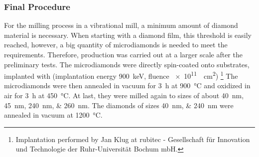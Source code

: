 	\subsubsection{Final Procedure}\label{subsubsec::final_procedure}

	For the milling process in a vibrational mill, a minimum amount of diamond material is necessary.
	When starting with a diamond film, this threshold is easily reached, however, a big quantity of microdiamonds is needed to meet the requirements.
	Therefore, production was carried out at a larger scale after the preliminary tests.
	The microdiamonds were directly spin-coated onto \ir substrates, implanted with  (implantation energy \SI{900}{keV}, fluence \SI{e11}{\per\centi\meter\squared}) \footnote{Implantation performed by Jan Klug at rubitec - Gesellschaft f\"ur Innovation und Technologie der Ruhr-Universit\"at Bochum mbH.}
	The microdiamonds were then annealed in vacuum for \SI{3}{\hour} at \SI{900}{\celsius} and oxidized in air for \SI{3}{\hour} at \SI{450}{\celsius}.
	At last, they were milled again to sizes of about \SIlist{40;45;240;260}{nm}.
	The diamonds of sizes \SIlist{40;240}{nm} were annealed in vacuum at \SI{1200}{\celsius}.

	



